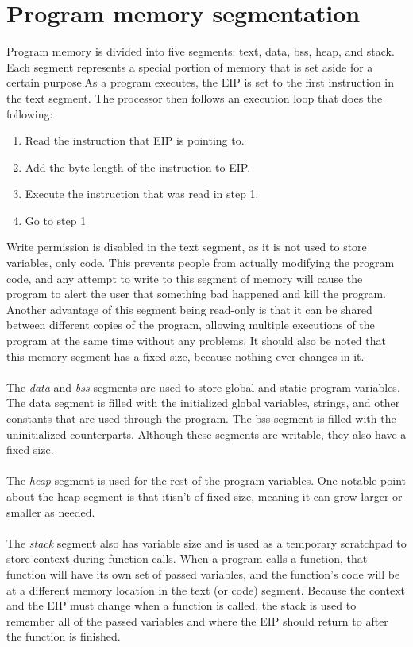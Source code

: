 \documentclass[10pt,a4paper]{book}
\begin{document}
\section{Program memory segmentation}
Program memory is divided into five segments: text, data, bss, heap, and stack. Each segment represents a special portion of memory that is set aside for a certain purpose.As a program executes, the EIP is set to the first instruction in the text segment. The processor then follows an execution loop that does the following:
\begin{enumerate}
\item Read the instruction that EIP is pointing to.
\item Add the byte-length of the instruction to EIP.
\item Execute the instruction that was read in step 1.
\item Go to step 1
\end{enumerate}
Write permission is disabled in the text segment, as it is not used to store variables, only code. This prevents people
from actually modifying the program code, and any attempt to write to this segment of memory will cause the program to alert the user that something bad happened and kill the program. Another advantage of this segment being read-only is that it can be shared between different copies of the program, allowing multiple executions of the program at the same time without any problems. It should also be noted that this memory segment has a fixed size, because nothing ever changes in it.\\\\
The \emph{data} and \emph{bss} segments are used to store global and static program variables. The data segment is filled with the initialized global variables, strings, and other constants that are used through the program. The bss segment is filled with the uninitialized counterparts. Although these segments are writable, they also have a fixed size.\\\\
The \emph{heap} segment is used for the rest of the program variables. One notable point about the heap segment is that itisn't of fixed size, meaning it can grow larger or smaller as needed.\\\\
The \emph{stack} segment also has variable size and is used as a temporary scratchpad to store context during function calls.
When a program calls a function, that function will have its own set of passed variables, and the function's code will be at a different memory location in the text (or code) segment. Because the context and the EIP must change when a
function is called, the stack is used to remember all of the passed variables and where the EIP should return to after the function is finished.
\end{document}
